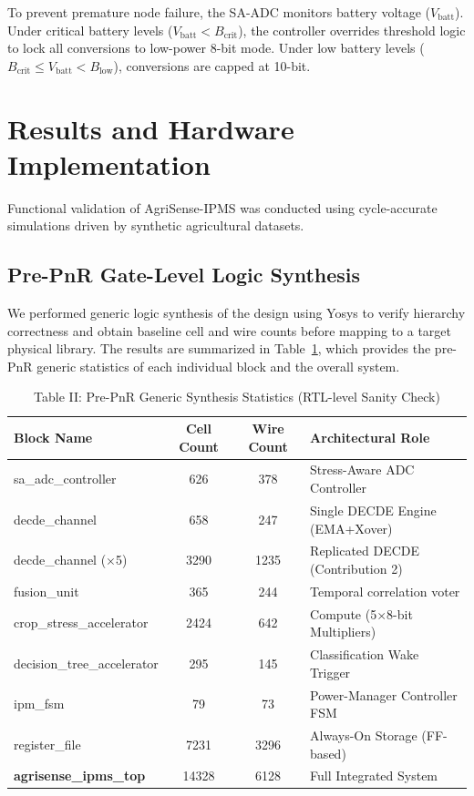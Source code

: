 \documentclass[conference]{IEEEtran}
\begin{document}
To prevent premature node failure, the SA-ADC monitors battery voltage ($V_{\text{batt}}$). Under critical battery levels ($V_{\text{batt}} < B_{\text{crit}}$), the controller overrides threshold logic to lock all conversions to low-power 8-bit mode. Under low battery levels ($B_{\text{crit}} \le V_{\text{batt}} < B_{\text{low}}$), conversions are capped at 10-bit.

\section{Results and Hardware Implementation}
Functional validation of AgriSense-IPMS was conducted using cycle-accurate simulations driven by synthetic agricultural datasets. 

\subsection{Pre-PnR Gate-Level Logic Synthesis}
We performed generic logic synthesis of the design using Yosys to verify hierarchy correctness and obtain baseline cell and wire counts before mapping to a target physical library. The results are summarized in Table~\ref{tab:pre_pnr_synth}, which provides the pre-PnR generic statistics of each individual block and the overall system.

\begin{table}[htbp]
\caption{Table II: Pre-PnR Generic Synthesis Statistics (RTL-level Sanity Check)}
\begin{center}
\begin{tabular}{|l|c|c|l|}
\hline
\textbf{Block Name} & \textbf{Cell Count} & \textbf{Wire Count} & \textbf{Architectural Role} \\
\hline
sa\_adc\_controller & 626 & 378 & Stress-Aware ADC Controller \\
decde\_channel & 658 & 247 & Single DECDE Engine (EMA+Xover) \\
decde\_channel ($\times$5) & 3290 & 1235 & Replicated DECDE (Contribution 2) \\
fusion\_unit & 365 & 244 & Temporal correlation voter \\
crop\_stress\_accelerator & 2424 & 642 & Compute (5$\times$8-bit Multipliers) \\
decision\_tree\_accelerator & 295 & 145 & Classification Wake Trigger \\
ipm\_fsm & 79 & 73 & Power-Manager Controller FSM \\
register\_file & 7231 & 3296 & Always-On Storage (FF-based) \\
\hline
\textbf{agrisense\_ipms\_top} & 14328 & 6128 & Full Integrated System \\
\hline
\end{tabular}
\label{tab:pre_pnr_synth}
\end{center}
\end{table}
\end{document}
